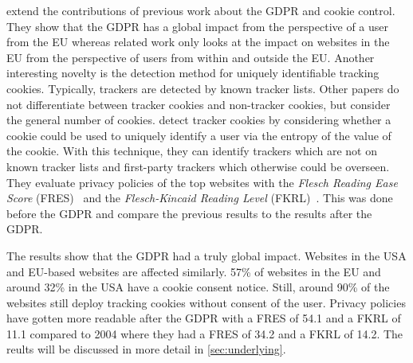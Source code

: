 \citeauthor{sanchez2019can} extend the contributions of previous work about the GDPR and cookie control. They show that
the GDPR has a global impact from the perspective of a user from the EU whereas related work only looks at the impact on
websites in the EU from the perspective of users from within and outside the EU. Another interesting novelty is the
detection method for uniquely identifiable tracking cookies. Typically, trackers are detected by known tracker lists.
Other papers do not differentiate between tracker cookies and non-tracker cookies, but consider the general number of
cookies. \citeauthor{sanchez2019can} detect tracker cookies by considering whether a cookie could be used to uniquely
identify a user via the entropy of the value of the cookie. With this technique, they can identify trackers which are not on known
tracker lists and first-party trackers which otherwise could be overseen. They evaluate privacy policies of the top
websites with the \emph{Flesch Reading Ease Score} (FRES)~\cite{flesch1948new}
and the \emph{Flesch-Kincaid Reading Level} (FKRL)~\cite{kincaid1975derivation}.
This was done before the GDPR and \citeauthor{sanchez2019can} compare the previous results to the results after the
GDPR.

The results show that the GDPR had a truly global impact. Websites in the USA and EU-based websites are affected
similarly. 57\% of websites in the EU and around 32\% in the USA have a cookie consent notice. Still, around 90\% of the
websites still deploy tracking cookies without consent of the user.
Privacy policies have gotten more readable after the GDPR with a FRES of 54.1 and a FKRL of 11.1 compared to 2004 where they had a
FRES of 34.2 and a FKRL of 14.2. The reults will be discussed in more detail in \autoref{sec:underlying}.


